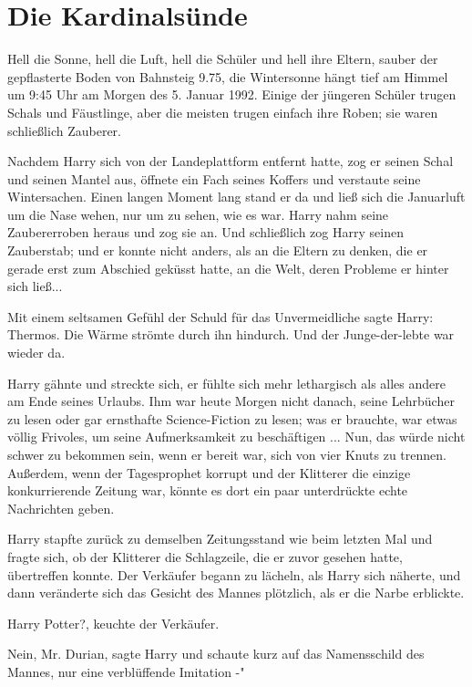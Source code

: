 \chapter{Die Kardinalsünde}

Hell die Sonne, hell die Luft, hell die Schüler und hell ihre Eltern, sauber der
gepflasterte Boden von Bahnsteig 9.75, die Wintersonne hängt tief am Himmel um
9:45 Uhr am Morgen des 5. Januar 1992. Einige der jüngeren Schüler trugen Schals
und Fäustlinge, aber die meisten trugen einfach ihre Roben; sie waren
schließlich Zauberer.

Nachdem Harry sich von der Landeplattform entfernt hatte, zog er seinen Schal
und seinen Mantel aus, öffnete ein Fach seines Koffers und verstaute seine
Wintersachen. Einen langen Moment lang stand er da und ließ sich die Januarluft
um die Nase wehen, nur um zu sehen, wie es war. Harry nahm seine Zaubererroben
heraus und zog sie an. Und schließlich zog Harry seinen Zauberstab; und er
konnte nicht anders, als an die Eltern zu denken, die er gerade erst zum
Abschied geküsst hatte, an die Welt, deren Probleme er hinter sich ließ...

Mit einem seltsamen Gefühl der Schuld für das Unvermeidliche sagte Harry: \glqq
Thermos.\grqq{} Die Wärme strömte durch ihn hindurch. Und der Junge-der-lebte
war wieder da.

Harry gähnte und streckte sich, er fühlte sich mehr lethargisch als alles andere
am Ende seines Urlaubs. Ihm war heute Morgen nicht danach, seine Lehrbücher zu
lesen oder gar ernsthafte Science-Fiction zu lesen; was er brauchte, war etwas
völlig Frivoles, um seine Aufmerksamkeit zu beschäftigen ... Nun, das würde
nicht schwer zu bekommen sein, wenn er bereit war, sich von vier Knuts zu
trennen. Außerdem, wenn der Tagesprophet korrupt und der Klitterer die einzige
konkurrierende Zeitung war, könnte es dort ein paar unterdrückte echte
Nachrichten geben.

Harry stapfte zurück zu demselben Zeitungsstand wie beim letzten Mal und fragte
sich, ob der Klitterer die Schlagzeile, die er zuvor gesehen hatte, übertreffen
konnte. Der Verkäufer begann zu lächeln, als Harry sich näherte, und dann
veränderte sich das Gesicht des Mannes plötzlich, als er die Narbe erblickte.

\glqq{}Harry Potter?\grqq{}, keuchte der Verkäufer.

\glqq{}Nein, Mr. Durian\grqq{}, sagte Harry und schaute kurz auf das
Namensschild des Mannes, \glqq{}nur eine verblüffende Imitation -"

